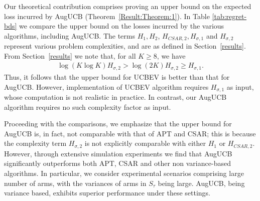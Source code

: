 Our theoretical contribution comprises 
 proving an upper bound on the expected loss incurred by AugUCB (Theorem~\ref{Result:Theorem:1}).
In Table \ref{tab:regret-bds} we compare the upper bound on the losses incurred by the various algorithms, including AugUCB. The terms $H_1, H_2$, $H_{CSAR,2}, H_{\sigma,1}$ and $H_{\sigma,2}$ represent various problem complexities, and are as defined in Section~\ref{results}. From Section~\ref{results} we note that, for all $K\ge8$, we have
\begin{align*}
\log\left(K\log K\right) H_{\sigma,2} > \log(2K) H_{\sigma,2} \ge H_{\sigma,1}.
\end{align*}
Thus, it follows that the upper bound for UCBEV is better than that for AugUCB.
 However, implementation of UCBEV algorithm requires $H_{\sigma,1}$ as input, whose computation is not realistic in practice. In contrast, our AugUCB algorithm requires no such complexity factor as input. 

Proceeding with the comparisons, we emphasize that the upper bound for  AugUCB is, in fact, not comparable with that of APT and CSAR; this is because the complexity term $H_{\sigma,2}$ is not explicitly comparable with either $H_1$ or $H_{CSAR,2}$. However, through extensive simulation experiments we find that AugUCB significantly outperforms both APT, CSAR and other non variance-based algorithms. In particular, we consider experimental scenarios comprising large number of arms, with the variances of arms in $S_\tau$ being large. AugUCB, being variance based, exhibits superior performance under these settings.  
%


